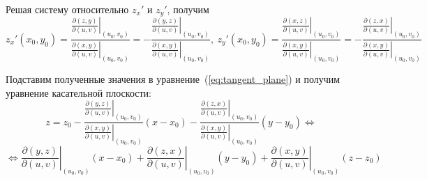 Решая систему относительно $z_x'$ и $z_y'$, получим
\begin{equation*}
z_x'(x_0, y_0) = \frac
{\left. \frac{\partial(z, y)}{\partial(u, v)} \right|_{(u_0, v_0)}}
{\left. \frac{\partial(x, y)}{\partial(u, v)} \right|_{(u_0, v_0)}} =
-\frac
{\left. \frac{\partial(y, z)}{\partial(u, v)} \right|_{(u_0, v_0)}}
{\left. \frac{\partial(x, y)}{\partial(u, v)} \right|_{(u_0, v_0)}}, \
z_y'(x_0, y_0) = \frac
{\left. \frac{\partial(x, z)}{\partial(u, v)} \right|_{(u_0, v_0)}}
{\left. \frac{\partial(x, y)}{\partial(u, v)} \right|_{(u_0, v_0)}} =
-\frac
{\left. \frac{\partial(z, x)}{\partial(u, v)} \right|_{(u_0, v_0)}}
{\left. \frac{\partial(x, y)}{\partial(u, v)} \right|_{(u_0, v_0)}}
\end{equation*}

Подставим полученные значения в уравнение~(\ref*{eq:tangent_plane}) и получим уравнение касательной плоскости:
\begin{equation*}
z = z_0 - \frac
{\left. \frac{\partial(y, z)}{\partial(u, v)} \right|_{(u_0, v_0)}}
{\left. \frac{\partial(x, y)}{\partial(u, v)} \right|_{(u_0, v_0)}} (x - x_0) -
\frac
{\left. \frac{\partial(z, x)}{\partial(u, v)} \right|_{(u_0, v_0)}}
{\left. \frac{\partial(x, y)}{\partial(u, v)} \right|_{(u_0, v_0)}} (y - y_0)  \Leftrightarrow
\end{equation*}
\begin{equation*}
\Leftrightarrow \left. \frac{\partial(y, z)}{\partial(u, v)} \right|_{(u_0, v_0)} (x - x_0) +
\left. \frac{\partial(z, x)}{\partial(u, v)} \right|_{(u_0, v_0)} (y - y_0) +
\left. \frac{\partial(x, y)}{\partial(u, v)} \right|_{(u_0, v_0)} (z - z_0)
\end{equation*}